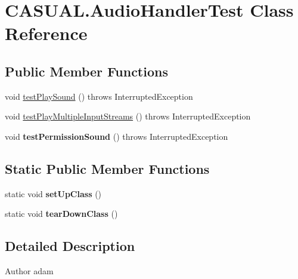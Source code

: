 \hypertarget{class_c_a_s_u_a_l_1_1_audio_handler_test}{\section{C\-A\-S\-U\-A\-L.\-Audio\-Handler\-Test Class Reference}
\label{class_c_a_s_u_a_l_1_1_audio_handler_test}
}
\subsection*{Public Member Functions}
\begin{DoxyCompactItemize}
\item 
void \hyperlink{class_c_a_s_u_a_l_1_1_audio_handler_test_a0274d24647e0c4ffa280fb0a78ebe6fc}{test\-Play\-Sound} ()  throws Interrupted\-Exception 
\item 
void \hyperlink{class_c_a_s_u_a_l_1_1_audio_handler_test_a8d96b51a3b631ec2c8ca3db8ef15f0b6}{test\-Play\-Multiple\-Input\-Streams} ()  throws Interrupted\-Exception 
\item 
\hypertarget{class_c_a_s_u_a_l_1_1_audio_handler_test_a0e09628857adecd01d394890e37cb41b}{void {\bfseries test\-Permission\-Sound} ()  throws Interrupted\-Exception }\label{class_c_a_s_u_a_l_1_1_audio_handler_test_a0e09628857adecd01d394890e37cb41b}

\end{DoxyCompactItemize}
\subsection*{Static Public Member Functions}
\begin{DoxyCompactItemize}
\item 
\hypertarget{class_c_a_s_u_a_l_1_1_audio_handler_test_a9de59baf425c062744e14c0c5749968d}{static void {\bfseries set\-Up\-Class} ()}\label{class_c_a_s_u_a_l_1_1_audio_handler_test_a9de59baf425c062744e14c0c5749968d}

\item 
\hypertarget{class_c_a_s_u_a_l_1_1_audio_handler_test_a94665934d921f86a582c63bfa5d73af7}{static void {\bfseries tear\-Down\-Class} ()}\label{class_c_a_s_u_a_l_1_1_audio_handler_test_a94665934d921f86a582c63bfa5d73af7}

\end{DoxyCompactItemize}


\subsection{Detailed Description}
\begin{DoxyAuthor}{Author}
adam 
\end{DoxyAuthor}


